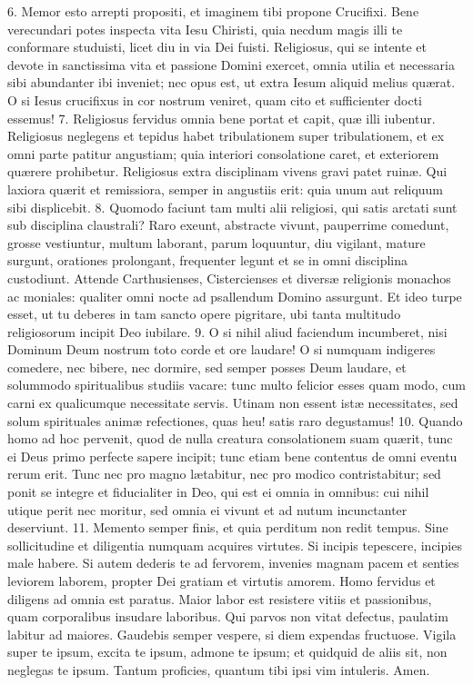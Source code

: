 6. Memor esto arrepti propositi, et imaginem tibi propone Crucifixi. Bene verecundari potes inspecta vita Iesu Chiristi, quia necdum magis illi te conformare studuisti, licet diu in via Dei fuisti. Religiosus, qui se intente et devote in sanctissima vita et passione Domini exercet, omnia utilia et necessaria sibi abundanter ibi inveniet; nec opus est, ut extra Iesum aliquid melius quærat. O si Iesus crucifixus in cor nostrum veniret, quam cito et sufficienter docti essemus!
7. Religiosus fervidus omnia bene portat et capit, quæ illi iubentur. Religiosus neglegens et tepidus habet tribulationem super tribulationem, et ex omni parte patitur angustiam; quia interiori consolatione caret, et exteriorem quærere prohibetur. Religiosus extra disciplinam vivens gravi patet ruinæ. Qui laxiora quærit et remissiora, semper in angustiis erit: quia unum aut reliquum sibi displicebit.
8. Quomodo faciunt tam multi alii religiosi, qui satis arctati sunt sub disciplina claustrali? Raro exeunt, abstracte vivunt, pauperrime comedunt, grosse vestiuntur, multum laborant, parum loquuntur, diu vigilant, mature surgunt, orationes prolongant, frequenter legunt et se in omni disciplina custodiunt. Attende Carthusienses, Cistercienses et diversæ religionis monachos ac moniales: qualiter omni nocte ad psallendum Domino assurgunt. Et ideo turpe esset, ut tu deberes in tam sancto opere pigritare, ubi tanta multitudo religiosorum incipit Deo iubilare.
9. O si nihil aliud faciendum incumberet, nisi Dominum Deum nostrum toto corde et ore laudare! O si numquam indigeres comedere, nec bibere, nec dormire, sed semper posses Deum laudare, et solummodo spiritualibus studiis vacare: tunc multo felicior esses quam modo, cum carni ex qualicumque necessitate servis. Utinam non essent istæ necessitates, sed solum spirituales animæ refectiones, quas heu! satis raro degustamus!
10. Quando homo ad hoc pervenit, quod de nulla creatura consolationem suam quærit, tunc ei Deus primo perfecte sapere incipit; tunc etiam bene contentus de omni eventu rerum erit. Tunc nec pro magno lætabitur, nec pro modico contristabitur; sed ponit se integre et fiducialiter in Deo, qui est ei omnia in omnibus: cui nihil utique perit nec moritur, sed omnia ei vivunt et ad nutum incunctanter deserviunt.
11. Memento semper finis, et quia perditum non redit tempus. Sine sollicitudine et diligentia numquam acquires virtutes. Si incipis tepescere, incipies male habere. Si autem dederis te ad fervorem, invenies magnam pacem et senties leviorem laborem, propter Dei gratiam et virtutis amorem. Homo fervidus et diligens ad omnia est paratus. Maior labor est resistere vitiis et passionibus, quam corporalibus insudare laboribus. Qui parvos non vitat defectus, paulatim labitur ad maiores. Gaudebis semper vespere, si diem expendas fructuose. Vigila super te ipsum, excita te ipsum, admone te ipsum; et quidquid de aliis sit, non neglegas te ipsum. Tantum proficies, quantum tibi ipsi vim intuleris. Amen.



